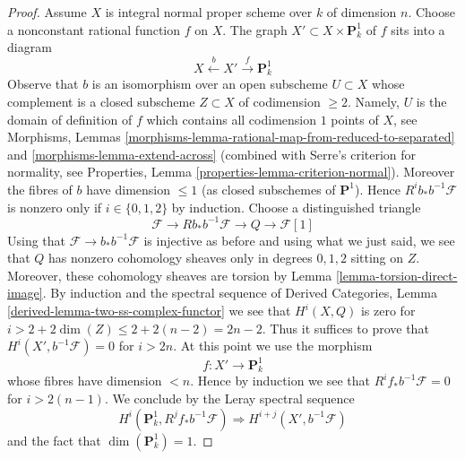 \begin{proof}
\medskip\noindent
Assume $X$ is integral normal proper scheme over $k$ of dimension $n$.
Choose a nonconstant rational function $f$ on $X$. The graph
$X' \subset X \times \mathbf{P}^1_k$ of $f$ sits into a diagram
$$
X \xleftarrow{b} X' \xrightarrow{f} \mathbf{P}^1_k
$$
Observe that $b$ is an isomorphism over an open subscheme
$U \subset X$ whose complement is a closed subscheme
$Z \subset X$ of codimension $\geq 2$. Namely, $U$ is the
domain of definition of $f$ which contains all codimension $1$
points of $X$, see
Morphisms, Lemmas \ref{morphisms-lemma-rational-map-from-reduced-to-separated}
and \ref{morphisms-lemma-extend-across}
(combined with Serre's criterion for normality, see
Properties, Lemma \ref{properties-lemma-criterion-normal}).
Moreover the fibres of $b$ have dimension $\leq 1$ (as closed subschemes
of $\mathbf{P}^1$). Hence $R^ib_*b^{-1}\mathcal{F}$ is nonzero only
if $i \in \{0, 1, 2\}$ by induction. Choose a distinguished triangle
$$
\mathcal{F} \to Rb_*b^{-1}\mathcal{F} \to Q \to \mathcal{F}[1]
$$
Using that $\mathcal{F} \to b_*b^{-1}\mathcal{F}$ is injective
as before and using what we just said, we see that $Q$ has nonzero
cohomology sheaves only in degrees $0, 1, 2$ sitting on $Z$.
Moreover, these cohomology sheaves are torsion by
Lemma \ref{lemma-torsion-direct-image}.
By induction and the spectral sequence of
Derived Categories, Lemma \ref{derived-lemma-two-ss-complex-functor}
we see that $H^i(X, Q)$ is zero for
$i > 2 + 2\dim(Z) \leq 2 + 2(n - 2) = 2n - 2$. Thus it suffices
to prove that $H^i(X', b^{-1}\mathcal{F}) = 0$ for
$i > 2n$. At this point we use the morphism
$$
f : X' \to \mathbf{P}^1_k
$$
whose fibres have dimension $< n$. Hence by induction we see that
$R^if_*b^{-1}\mathcal{F} = 0$ for $i > 2(n - 1)$.
We conclude by the Leray spectral sequence
$$
H^i(\mathbf{P}^1_k, R^jf_*b^{-1}\mathcal{F})
\Rightarrow
H^{i + j}(X', b^{-1}\mathcal{F})
$$
and the fact that $\dim(\mathbf{P}^1_k) = 1$.
\end{proof}